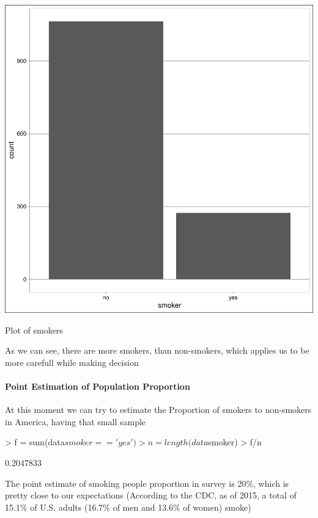 \documentclass{article}
\begin{document}
\begin{centerfig}
\includegraphics{Untitled-003}
\caption{Plot of smokers}
\end{centerfig}

As we can see, there are more smokers, than non-smokers, which applies us to be more carefull while making decision

\paragraph{Point Estimation of Population Proportion \newline} 
At this moment we can try to estimate the Proportion of smokers to non-smokers in America, having that small sample

\begin{Schunk}
\begin{Sinput}
> f = sum(data$smoker=='yes')
> n = length(data$smoker)
> f/n
\end{Sinput}
\begin{Soutput}
[1] 0.2047833
\end{Soutput}
\end{Schunk}

The point estimate of smoking people proportion in survey is 20\%, which is pretty close to our expectations (According to the CDC, as of 2015, a total of 15.1\% of U.S. adults (16.7\% of men and 13.6\% of women) smoke)
\end{document}
